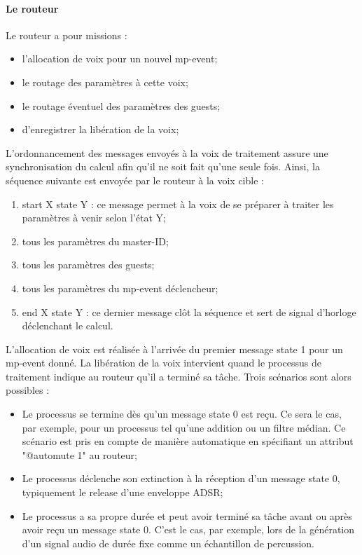 \paragraph{Le routeur}
Le routeur a pour missions :
\vspace{-1em}
\begin{itemize}[noitemsep]
	\item l'allocation de voix pour un nouvel mp-event;
	\item le routage des paramètres à cette voix;
	\item le routage éventuel des paramètres des guests;
	\item d'enregistrer la libération de la voix;
\end{itemize}
L'ordonnancement des messages envoyés à la voix de traitement assure une synchronisation du calcul afin qu'il ne soit fait qu'une seule fois. Ainsi, la séquence suivante est envoyée par le routeur à la voix cible :
\vspace{-1em}
\begin{enumerate}[noitemsep]
	\item start X state Y : ce message permet à la voix de se préparer à traiter les paramètres à venir selon l'état Y;
	\item tous les paramètres du master-ID;
	\item tous les paramètres des guests;
	\item tous les paramètres du mp-event déclencheur;
	\item end X state Y : ce dernier message clôt la séquence et sert de signal d'horloge déclenchant le calcul.
\end{enumerate}
L'allocation de voix est réalisée à l'arrivée du premier message state 1 pour un mp-event donné. La libération de la voix intervient quand le processus de traitement indique au routeur qu'il a terminé sa tâche. Trois scénarios sont alors possibles :
\vspace{-1em}
\begin{itemize}[noitemsep]
	\item Le processus se termine dès qu'un message state 0 est reçu. Ce sera le cas, par exemple, pour un processus tel qu'une addition ou un filtre médian. Ce scénario est pris en compte de manière automatique en spécifiant un attribut "@automute 1" au routeur;
	\item Le processus déclenche son extinction à la réception d'un message state 0, typiquement le release d'une enveloppe ADSR;
	\item Le processus a sa propre durée et peut avoir terminé sa tâche avant ou après avoir reçu un message state 0. C'est le cas, par exemple, lors de la génération d'un signal audio de durée fixe comme un échantillon de percussion.
\end{itemize}

